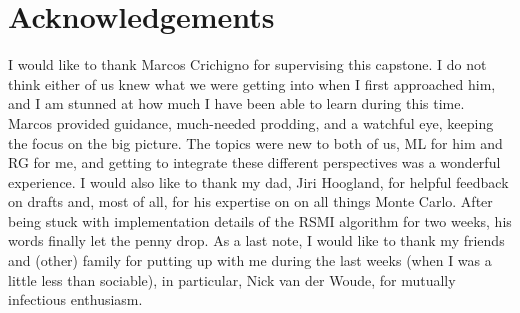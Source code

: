 \section*{Acknowledgements}
I would like to thank Marcos Crichigno for supervising this
capstone. I do not think either of us knew what we were getting into
when I first approached him, and I am stunned at how much I have been
able to learn during this time. Marcos provided guidance, much-needed
prodding, and a watchful eye, keeping the focus on the big
picture. The topics were new to both of us, ML for him and RG for me,
and getting to integrate these different perspectives was a wonderful
experience. I would also like to thank my dad, Jiri Hoogland, for
helpful feedback on drafts and, most of all, for his expertise on on
all things Monte Carlo. After being stuck with implementation details
of the RSMI algorithm for two weeks, his words finally let the penny
drop. As a last note, I would like to thank my friends and (other)
family for putting up with me during the last weeks (when I was a
little less than sociable), in particular, Nick van der Woude, for
mutually infectious enthusiasm.
